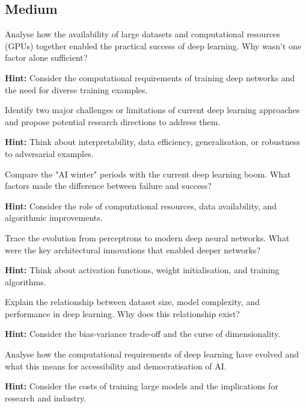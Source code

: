 \subsection*{Medium}

\begin{problem}
Analyse how the availability of large datasets and computational resources (GPUs) together enabled the practical success of deep learning. Why wasn't one factor alone sufficient?

\textbf{Hint:} Consider the computational requirements of training deep networks and the need for diverse training examples.
\end{problem}

\begin{problem}
Identify two major challenges or limitations of current deep learning approaches and propose potential research directions to address them.

\textbf{Hint:} Think about interpretability, data efficiency, generalisation, or robustness to adversarial examples.
\end{problem}

\begin{problem}
Compare the "AI winter" periods with the current deep learning boom. What factors made the difference between failure and success?

\textbf{Hint:} Consider the role of computational resources, data availability, and algorithmic improvements.
\end{problem}

\begin{problem}
Trace the evolution from perceptrons to modern deep neural networks. What were the key architectural innovations that enabled deeper networks?

\textbf{Hint:} Think about activation functions, weight initialisation, and training algorithms.
\end{problem}

\begin{problem}
Explain the relationship between dataset size, model complexity, and performance in deep learning. Why does this relationship exist?

\textbf{Hint:} Consider the bias-variance trade-off and the curse of dimensionality.
\end{problem}

\begin{problem}
Analyse how the computational requirements of deep learning have evolved and what this means for accessibility and democratisation of AI.

\textbf{Hint:} Consider the costs of training large models and the implications for research and industry.
\end{problem}

